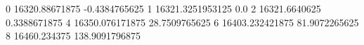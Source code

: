 0 16320.88671875 -0.4384765625
1 16321.3251953125 0.0
2 16321.6640625 0.3388671875
4 16350.076171875 28.7509765625
6 16403.232421875 81.9072265625
8 16460.234375 138.9091796875
